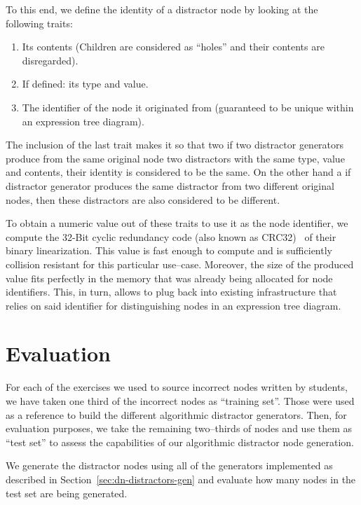 \begin{chapterBody}
To this end, we define the identity of a distractor node by looking at the
following traits:

\begin{enumerate}
    \item Its contents (Children are considered as ``holes'' and their contents
are disregarded).
    \item If defined: its type and value.
    \item The identifier of the node it originated from (guaranteed to be unique
within an expression tree diagram).
\end{enumerate}

The inclusion of the last trait makes it so that two if two distractor
generators produce from the same original node two distractors with the same
type, value and contents, their identity is considered to be the same. On the
other hand a if distractor generator produces the same distractor from two
different original nodes, then these distractors are also considered to be
different.

To obtain a numeric value out of these traits to use it as the node
identifier, we compute the 32-Bit cyclic redundancy code (also known as
CRC32)~\cite{koopman_32-bit_2002} of their binary linearization. This value is
fast enough to compute and is sufficiently collision resistant for this
particular use–case. Moreover, the size of the produced value fits perfectly in
the memory that was already being allocated for node identifiers. This, in turn,
allows to plug back into existing infrastructure that relies on said identifier
for distinguishing nodes in an expression tree diagram.

\section{Evaluation}

For each of the exercises we used to source incorrect nodes written by
students, we have taken one third of the incorrect nodes as ``training set''.
Those were used as a reference to build the different algorithmic distractor
generators.
Then, for evaluation purposes, we take the remaining two–thirds of nodes and
use them as ``test set'' to assess the capabilities of our algorithmic distractor
node generation.

We generate the distractor nodes using all of the generators implemented as
described in Section~\ref{sec:dn-distractors-gen} and evaluate how many
nodes in the test set are being generated.


\end{chapterBody}
